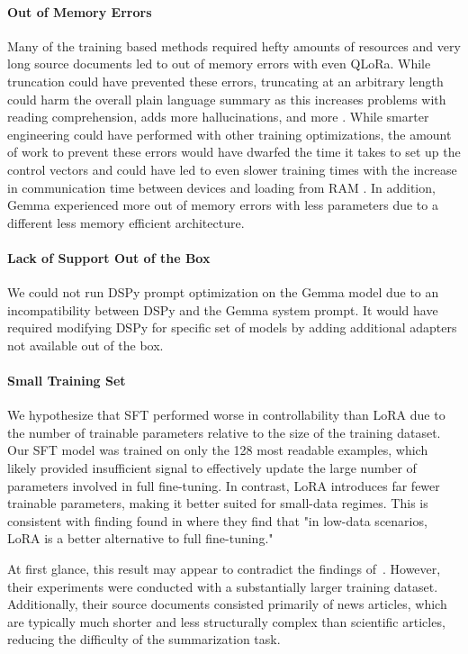 \paragraph{Out of Memory Errors}
Many of the training based methods required hefty amounts of resources and very long source documents led to out of memory errors with even QLoRa. While truncation could have prevented these errors, truncating at an arbitrary length could harm the overall plain language summary as this increases problems with reading comprehension, adds more hallucinations, and more \cite{ding2024fewertruncationsimprovelanguage}. While smarter engineering could have performed with other training optimizations, the amount of work to prevent these errors would have dwarfed the time it takes to set up the control vectors and could have led to even slower training times with the increase in communication time between devices and loading from RAM \cite{rajbhandari2020zeromemoryoptimizationstraining}. In addition, Gemma experienced more out of memory errors with less parameters  due to a different less memory efficient architecture. 
\paragraph{Lack of Support Out of the Box}
We could not run DSPy prompt optimization on the Gemma model due to an incompatibility between DSPy and the Gemma system prompt. It would have required modifying DSPy for specific set of models by adding additional adapters not available out of the box. 
\paragraph{Small Training Set}
We hypothesize that SFT performed worse in controllability than LoRA due to the number of trainable parameters relative to the size of the training dataset. Our SFT model was trained on only the 128 most readable examples, which likely provided insufficient signal to effectively update the large number of parameters involved in full fine-tuning. In contrast, LoRA introduces far fewer trainable parameters, making it better suited for small-data regimes. This is consistent with finding found in \cite{whitehouse-etal-2024-low} where they find that "in low-data scenarios, LoRA is a better alternative to full fine-tuning."

At first glance, this result may appear to contradict the findings of~\textcite{ribeiro-etal-2023-generating}. However, their experiments were conducted with a substantially larger training dataset. Additionally, their source documents consisted primarily of news articles, which are typically much shorter and less structurally complex than scientific articles, reducing the difficulty of the summarization task.